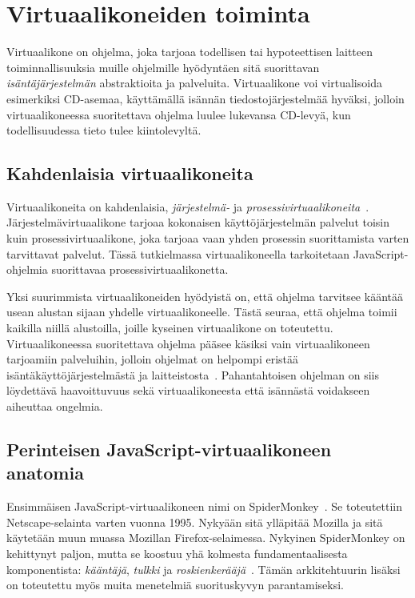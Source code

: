 \section{Virtuaalikoneiden toiminta}

Virtuaalikone on ohjelma, joka tarjoaa todellisen tai hypoteettisen laitteen toiminnallisuuksia muille ohjelmille hyödyntäen sitä suorittavan \textit{isäntäjärjestelmän} abstraktioita ja palveluita. Virtuaalikone voi virtualisoida esimerkiksi CD-asemaa, käyttämällä isännän tiedostojärjestelmää hyväksi, jolloin virtuaalikoneessa suoritettava ohjelma luulee lukevansa CD-levyä, kun todellisuudessa tieto tulee kiintolevyltä.

\subsection{Kahdenlaisia virtuaalikoneita}

Virtuaalikoneita on kahdenlaisia, \textit{järjestelmä-} ja \textit{prosessivirtuaalikoneita}~\cite[s.~33]{vms}. Järjestelmävirtuaalikone tarjoaa kokonaisen käyttöjärjestelmän palvelut toisin kuin prosessivirtuaalikone, joka tarjoaa vaan yhden prosessin suorittamista varten tarvittavat palvelut. Tässä tutkielmassa virtuaalikoneella tarkoitetaan JavaScript-ohjelmia suorittavaa prosessivirtuaalikonetta.

Yksi suurimmista virtuaalikoneiden hyödyistä on, että ohjelma tarvitsee kääntää usean alustan sijaan yhdelle virtuaalikoneelle. Tästä seuraa, että ohjelma toimii kaikilla niillä alustoilla, joille kyseinen virtuaalikone on toteutettu. Virtuaalikoneessa suoritettava ohjelma pääsee käsiksi vain virtuaalikoneen tarjoamiin palveluihin, jolloin ohjelmat on helpompi eristää isäntäkäyttöjärjestelmästä ja laitteistosta~\cite[s.~36]{vms}. Pahantahtoisen ohjelman on siis löydettävä haavoittuvuus sekä virtuaalikoneesta että isännästä voidakseen aiheuttaa ongelmia.

\subsection{Perinteisen JavaScript-virtuaalikoneen anatomia}

Ensimmäisen JavaScript-virtuaalikoneen nimi on SpiderMonkey~\cite{spidermonkey}. Se toteutettiin Netscape-selainta varten vuonna 1995. Nykyään sitä ylläpitää Mozilla ja sitä käytetään muun muassa Mozillan Firefox-selaimessa. Nykyinen SpiderMonkey on kehittynyt paljon, mutta se koostuu yhä kolmesta fundamentaalisesta komponentista: \textit{kääntäjä}, \textit{tulkki} ja \textit{roskienkerääjä}~\cite{spidermonkeydesign}. Tämän arkkitehtuurin lisäksi on toteutettu myös muita menetelmiä suorituskyvyn parantamiseksi.

